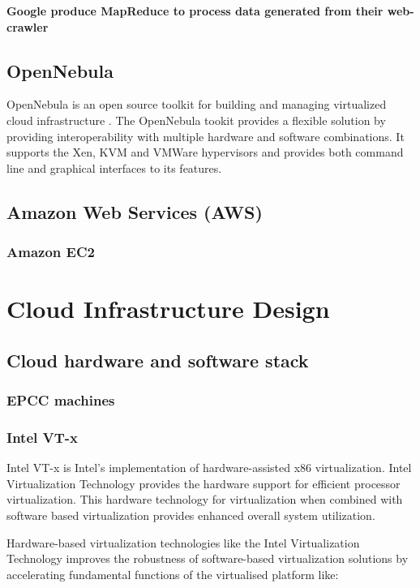 \documentclass[12pt,a4paper]{report}
\begin{document}
{\bf Google produce MapReduce to process data generated from their web-crawler}

\section{OpenNebula}

OpenNebula is an open source toolkit for building and managing virtualized
cloud infrastructure \cite{website:one}. The OpenNebula tookit provides a flexible
solution by providing interoperability with multiple hardware and software combinations.
It supports the Xen, KVM and VMWare hypervisors and provides both command line
and graphical interfaces to its features.


\section{Amazon Web Services (AWS)}

\subsection{Amazon EC2}

\chapter{Cloud Infrastructure Design}

\section{Cloud hardware and software stack}
\subsection{EPCC machines}
\subsection{Intel VT-x}

Intel VT-x is Intel's implementation of hardware-assisted x86 virtualization.
Intel Virtualization Technology provides the hardware support for efficient processor virtualization.
This hardware technology for virtualization when combined with software based virtualization provides 
enhanced overall system utilization.\cite{website:intel-VT}

Hardware-based virtualization technologies like the Intel Virtualization Technology
improves the robustness of software-based virtualization solutions by accelerating
fundamental functions of the virtualised platform like:\cite{neiger2006intel}
\end{document}
